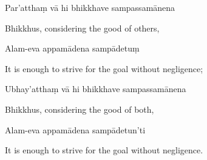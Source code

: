 Par'atthaṃ vā hi bhikkhave sampassamānena

\begin{english}
  Bhikkhus, considering the good of others,
\end{english}

Alam-eva appamādena sampādetuṃ

\begin{english}
  It is enough to strive for the goal without negligence;
\end{english}

Ubhay'atthaṃ vā hi bhikkhave sampassamānena

\begin{english}
  Bhikkhus, considering the good of both,
\end{english}

Alam-eva appamādena sampādetun'ti

\begin{english}
  It is enough to strive for the goal without negligence.
\end{english}

